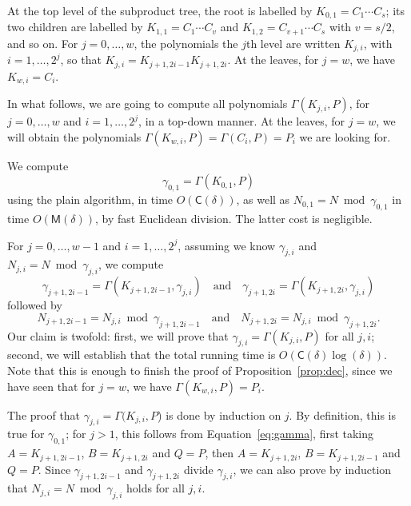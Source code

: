\documentclass[12pt]{article}
\def\CC {\ensuremath{\mathsf{C}}}
\def\M {\ensuremath{\mathsf{M}}}
\begin{document}
At the top level of the subproduct tree, the root is labelled by
$K_{0,1}=C_1\cdots C_s$; its two children are labelled by $K_{1,1}=C_1
\cdots C_v$ and $K_{1,2}=C_{v+1} \cdots C_s$ with $v=s/2$, and so
on. For $j=0,\dots,w$, the polynomials the $j$th level are written
$K_{j,i}$, with $i=1,\dots,2^j$, so that $K_{j,i}=K_{j+1,2i-1}
K_{j+1,2i}$. At the leaves, for $j=w$, we have $K_{w,i}=C_{i}$.

In what follows, we are going to compute all polynomials
$\Gamma(K_{j,i},P)$, for $j=0,\dots,w$ and $i=1,\dots,2^j$, in a
top-down manner. At the leaves, for $j=w$, we will obtain the
polynomials $\Gamma(K_{w,i},P) =\Gamma(C_i,P)=P_i$ we are looking for.

\bigskip{} We compute
$$\gamma_{0,1} = \Gamma(K_{0,1},P)$$ using the plain algorithm, in
time $O(\CC(\delta))$, as well as $N_{0,1} = N \bmod \gamma_{0,1}$ in
time $O(\M(\delta))$, by fast Euclidean division. The latter cost is
negligible.

\bigskip{} For $j=0,\dots,w-1$ and
$i=1,\dots,2^j$, assuming we know $\gamma_{j,i}$ and $N_{j,i}=N \bmod
\gamma_{j,i}$, we compute
$$\gamma_{j+1,2i-1} = \Gamma(K_{j+1,2i-1}, \gamma_{j,i})
\quad\text{and}\quad \gamma_{j+1,2i} =
\Gamma(K_{j+1,2i},\gamma_{j,i})$$ followed by
$$N_{j+1,2i-1} = N_{j,i} \bmod \gamma_{j+1,2i-1} \quad\text{and}\quad
N_{j+1,2i} = N_{j,i} \bmod \gamma_{j+1,2i}.$$ Our claim is twofold:
first, we will prove that $\gamma_{j,i}=\Gamma(K_{j,i},P)$ for all
$j,i$; second, we will establish that the total running time is
$O(\CC(\delta)\log(\delta))$. Note that this is enough to finish the
proof of Proposition~\ref{prop:dec}, since we have seen that for
$j=w$, we have $\Gamma(K_{w,i},P)=P_i$.

The proof that $\gamma_{j,i}=\Gamma(K_{j,i},P$) is done by induction
on $j$. By definition, this is true for $\gamma_{0,1}$; for $j > 1$,
this follows from Equation~\eqref{eq:gamma}, first taking
$A=K_{j+1,2i-1}$, $B=K_{j+1,2i}$ and $Q=P$, then $A=K_{j+1,2i}$,
$B=K_{j+1,2i-1}$ and $Q=P$.  Since $\gamma_{j+1,2i-1}$ and
$\gamma_{j+1,2i}$ divide $\gamma_{j,i}$, we can also prove by
induction that $N_{j,i}=N \bmod \gamma_{j,i}$ holds for all $j,i$.
\end{document}

